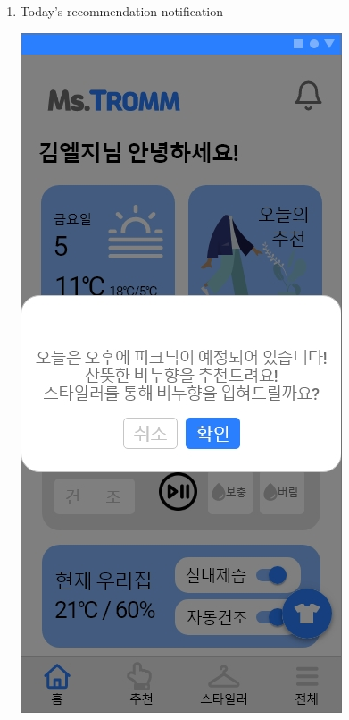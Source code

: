 \documentclass[conference]{IEEEtran}
\begin{document}
\begin{enumerate}
    \item Today's recommendation notification \\
    \centerline{\includegraphics[scale=0.18]{assets/오늘의 추천 팝업1.jpg}
}
\end{enumerate}
\end{document}

